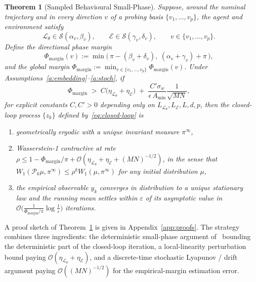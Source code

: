 \documentclass[11pt,a4paper]{article}
\newtheorem{theorem}{Theorem}[section]
\theoremstyle{definition}
\theoremstyle{remark}
\newcommand{\agent}{\mathcal{L}_{\theta}}
\newcommand{\env}{\mathcal{E}}
\newcommand{\sectorial}[2]{\mathcal{S}(#1,#2)}
\newcommand{\PhaseMargin}{\Phi_{\mathrm{margin}}}
\newcommand{\Wone}{W_{1}}
\begin{document}
\begin{theorem}[Sampled Behavioural Small-Phase]\label{thm:main}
Suppose, around the nominal trajectory and in every direction $v$ of a
probing basis $\{v_{1},\dots,v_{p}\}$, the agent and environment satisfy
\begin{equation}\label{eq:sectorial-classes}
\agent\in\sectorial{\alpha_{v}}{\beta_{v}},\qquad
\env\in\sectorial{\gamma_{v}}{\delta_{v}},\qquad v\in\{v_{1},\dots,v_{p}\}.
\end{equation}
Define the directional \emph{phase margin}
\begin{equation}\label{eq:margin}
\PhaseMargin(v) := \min\!\big(\,\pi-(\beta_{v}+\delta_{v}),\;
                                    (\alpha_{v}+\gamma_{v})+\pi\,\big),
\end{equation}
and the global margin
$\PhaseMargin := \min_{v\in\{v_{1},\dots,v_{p}\}}\PhaseMargin(v)$.
Under Assumptions~\ref{a:embedding}--\ref{a:stoch}, if
\begin{equation}\label{eq:main-condition}
\PhaseMargin \;>\; C\!\bigl(\eta_{\agent}+\eta_{\env}\bigr) \;+\;
\frac{C'\sigma_{w}}{\epsilon\,A_{\min}}\frac{1}{\sqrt{MN}},
\end{equation}
for explicit constants $C,C'>0$ depending only on
$L_{\agent},L_{\env},L,d,p$, then the closed-loop process
$\{z_{k}\}$ defined by~\eqref{eq:closed-loop} is

\begin{enumerate}[leftmargin=*,label=(\arabic*)]
\item geometrically ergodic with a unique invariant measure $\pi^{\infty}$,
\item Wasserstein-1 contractive at rate
$\rho \le 1 - \PhaseMargin/\pi + \mathcal{O}(\eta_{\agent}+\eta_{\env}+(MN)^{-1/2})$, in the sense that
$\Wone(\mathcal{P}_{k}\mu,\pi^{\infty})\le \rho^{k}\Wone(\mu,\pi^{\infty})$ for any initial distribution $\mu$,
\item the empirical observable $y_{k}$ converges in distribution to a
unique stationary law and the running mean settles within
$\varepsilon$ of its asymptotic value in $\mathcal{O}\bigl(\frac{1}{\PhaseMargin/\pi}\log\frac{1}{\varepsilon}\bigr)$
iterations.
\end{enumerate}
\end{theorem}

A proof sketch of Theorem~\ref{thm:main} is given in
Appendix~\ref{app:proofs}.  The strategy combines three ingredients:
the deterministic small-phase argument
of~\citep{Chen2023PhaseTheory,Chen2021PhaseNonlinear} bounding the
deterministic part of the closed-loop iteration, a local-linearity
perturbation bound paying $\mathcal{O}(\eta_{\agent}+\eta_{\env})$, and a
discrete-time stochastic Lyapunov / drift argument paying
$\mathcal{O}((MN)^{-1/2})$ for the empirical-margin estimation error.
\end{document}
